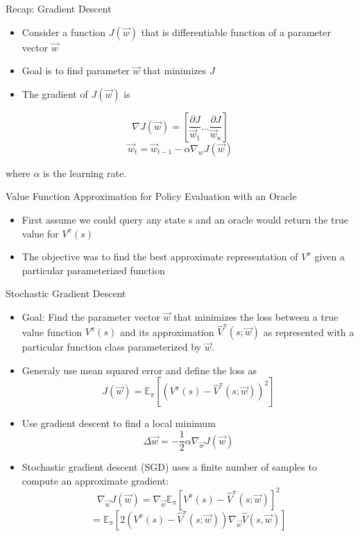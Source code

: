 \begin{frame}[c]{Recap: Gradient Descent}
	
	
	\begin{itemize}
		\item Consider a function $J(\vec{w})$ that is differentiable function of a parameter vector $\vec{w}$
		\item Goal is to find parameter $\vec{w}$ that minimizes $J$
		\item The gradient of $J(\vec{w})$ is 
	\end{itemize}
	$$
	\nabla J(\vec{w}) = \left[ \frac{\partial J}{\vec{w}_1} \ldots \frac{\partial J}{\vec{w}_n} \right]
	$$
	$$\vec{w}_t = \vec{w}_{t-1} - \alpha \nabla_w J(\vec{w})$$
	
	where $\alpha$ is the learning rate.

	
\end{frame}
\begin{frame}[c]{Value Function Approximation for Policy Evaluation with
		an Oracle}
	
	
	\begin{itemize}
		\item First assume we could query any state s and an \alert{oracle} would return
		the true value for $V^\pi (s)$
		\item The objective was to find the best approximate representation of $V^\pi$
		given a particular parameterized function
	\end{itemize}
	
\end{frame}
\begin{frame}[c]{Stochastic Gradient Descent}
	
	
	\begin{itemize}
		\item Goal: Find the parameter vector $\vec{w}$ that minimizes the loss between a
		true value function $V^\pi(s)$ and its approximation $\hat{V}^\pi(s; \vec{w})$ as
		represented with a particular function class parameterized by $\vec{w}$.
		\item Generaly use mean squared error and define the loss as 
		$$ J(\vec{w}) = \mathbb{E}_\pi [(V^\pi(s) - \hat{V}^\pi(s;\vec{w}))^2]$$
		\item Use gradient descent to find a local minimum 
		$$ \Delta \vec{w} = - \frac{1}{2} \alpha \nabla_\vec{w} J(\vec{w})$$
		\item Stochastic gradient descent (SGD) uses a finite number of samples to compute an approximate gradient:
		$$ \nabla_\vec{w} J(\vec{w}) = \nabla_{\vec{w}} \mathbb{E}_\pi[V^\pi (s) - \hat{V}^\pi (s; \vec{w})]^2$$
		$$= \mathbb{E}_\pi [2 (V^\pi(s) - \hat{V}^\pi (s;\vec{w})) \nabla_\vec{w} \hat{V}(s,\vec{w})]$$
	\end{itemize}
	
\end{frame}
